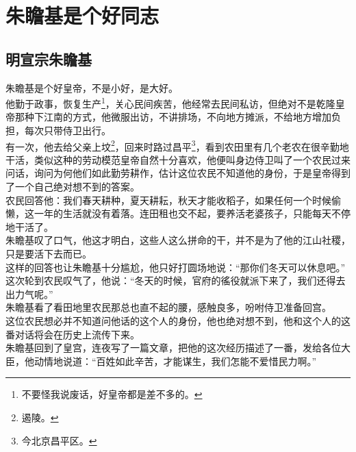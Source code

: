 \section{朱瞻基是个好同志}
\ifnum{}
	\begin{multicols}{\theparacolNo}
\fi
\subsection{明宣宗朱瞻基}
朱瞻基是个好皇帝，不是小好，是大好。\\

他勤于政事，恢复生产\footnote{不要怪我说废话，好皇帝都是差不多的。}，关心民间疾苦，他经常去民间私访，但绝对不是乾隆皇帝那种下江南的方式，他微服出访，不讲排场，不向地方摊派，不给地方增加负担，每次只带侍卫出行。\\

有一次，他去给父亲上坟\footnote{遏陵。}，回来时路过昌平\footnote{今北京昌平区。}，看到农田里有几个老农在很辛勤地干活，类似这种的劳动模范皇帝自然十分喜欢，他便叫身边侍卫叫了一个农民过来问话，询问为何他们如此勤劳耕作，估计这位农民不知道他的身份，于是皇帝得到了一个自己绝对想不到的答案。\\

农民回答他：我们春天耕种，夏天耕耘，秋天才能收稻子，如果任何一个时候偷懒，这一年的生活就没有着落。连田租也交不起，要养活老婆孩子，只能每天不停地干活了。\\

朱瞻基叹了口气，他这才明白，这些人这么拼命的干，并不是为了他的江山社稷，只是要活下去而已。\\

这样的回答也让朱瞻基十分尴尬，他只好打圆场地说：“那你们冬天可以休息吧。”\\

这次轮到农民叹气了，他说：“冬天的时候，官府的徭役就派下来了，我们还得去出力气呢。”\\

朱瞻基看了看田地里农民那总也直不起的腰，感触良多，吩咐侍卫准备回宫。\\

这位农民想必并不知道问他话的这个人的身份，他也绝对想不到，他和这个人的这番对话将会在历史上流传下来。\\

朱瞻基回到了皇宫，连夜写了一篇文章，把他的这次经历描述了一番，发给各位大臣，他动情地说道：“百姓如此辛苦，才能谋生，我们怎能不爱惜民力啊。”\\


\end{multicols}
